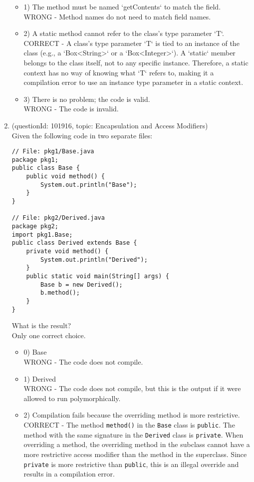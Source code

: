 \documentclass[12pt]{article}
\begin{document}
\begin{enumerate}[label=(\arabic*)]
\begin{itemize}
\item 1) The method must be named `getContents` to match the field.
 \\ 
WRONG - Method names do not need to match field names.

\item 2) A static method cannot refer to the class's type parameter `T`.
 \\ 
CORRECT - A class's type parameter `T` is tied to an instance of the class (e.g., a `Box<String>` or a `Box<Integer>`). A `static` member belongs to the class itself, not to any specific instance. Therefore, a static context has no way of knowing what `T` refers to, making it a compilation error to use an instance type parameter in a static context.

\item 3) There is no problem; the code is valid.
 \\ 
WRONG - The code is invalid.

\end{itemize}
\item (questionId: 101916, topic: Encapsulation and Access Modifiers) \\ 
Given the following code in two separate files:
\begin{verbatim}
// File: pkg1/Base.java
package pkg1;
public class Base {
    public void method() {
        System.out.println("Base");
    }
}

// File: pkg2/Derived.java
package pkg2;
import pkg1.Base;
public class Derived extends Base {
    private void method() {
        System.out.println("Derived");
    }
    public static void main(String[] args) {
        Base b = new Derived();
        b.method();
    }
}
\end{verbatim}
What is the result?
\\ \noindent Only one correct choice. 
\begin{itemize}
\item 0) Base
 \\ 
WRONG - The code does not compile.

\item 1) Derived
 \\ 
WRONG - The code does not compile, but this is the output if it were allowed to run polymorphically.

\item 2) Compilation fails because the overriding method is more restrictive.
 \\ 
CORRECT - The method \verb|method()| in the \verb|Base| class is \verb|public|. The method with the same signature in the \verb|Derived| class is \verb|private|. When overriding a method, the overriding method in the subclass cannot have a more restrictive access modifier than the method in the superclass. Since \verb|private| is more restrictive than \verb|public|, this is an illegal override and results in a compilation error.


\end{itemize}
\end{enumerate}
\end{document}
